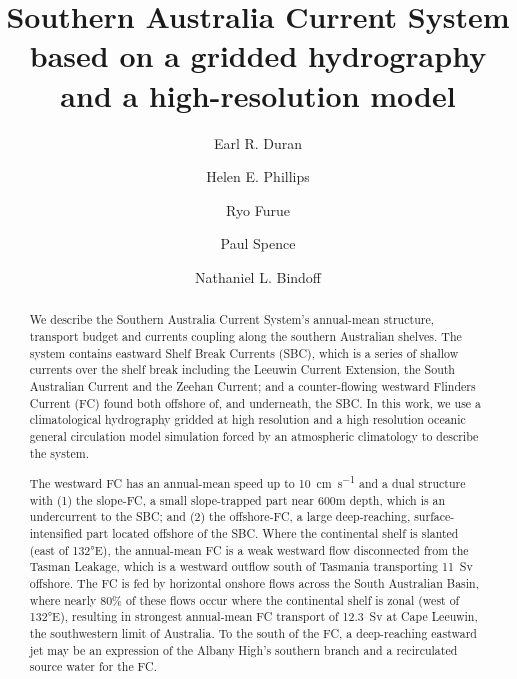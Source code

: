 \documentclass[preprint,3p,review,12pt]{elsarticle}
\begin{document}
\begin{frontmatter}

\title{Southern Australia Current System based on a gridded hydrography and a high-resolution model}

\author[label2]{Earl R. Duran}
\author[label3,label4]{Helen E. Phillips}
\author[label5]{Ryo Furue}
\author[label2,label4]{Paul Spence}
\author[label3,label4,label6,label7]{Nathaniel L. Bindoff}

\address[label2]{Climate Change Research Centre (CCRC), University of New South Wales, Sydney, NSW 2052 Australia}
\address[label3]{Institute for Marine and Antarctic Studies (IMAS), Hobart, Tasmania, Australia}
\address[label4]{ARC Centre of Excellence for Climate Extremes (CLEX)}\address[label5]{Japan Agency for Marine-Earth Science and Technology (JAMSTEC), Yokohama, Japan}
\address[label6]{Commonwealth Scientific and Industrial Research Organisation (CSIRO)}
\address[label7]{Antarctic Climate and Ecosystems Cooperative Research Centre (ACE CRC), Hobart, Tasmania, Australia}


\begin{abstract}
We describe the Southern Australia Current System's annual-mean structure, transport budget and currents coupling along the southern Australian shelves. The system contains eastward Shelf Break Currents (SBC), which is a series of shallow currents over the shelf break including the Leeuwin Current Extension, the South Australian Current and the Zeehan Current; and a counter-flowing westward Flinders Current (FC) found both offshore of, and underneath, the SBC\@.
In this work, we use a climatological hydrography gridded at high resolution and a high resolution oceanic general circulation model simulation forced by an atmospheric climatology to describe the system.

The westward FC has an annual-mean speed up to \SI{10}{\centi\meter\per\second} and a dual structure with (1) the slope-FC, a small slope-trapped part near 600m depth, which is an undercurrent to the SBC; and (2) the offshore-FC, a large deep-reaching, surface-intensified part located offshore of the SBC\@.
Where the continental shelf is slanted (east of \ang{132}E), the annual-mean FC is a weak westward flow disconnected from the Tasman Leakage, which is a westward outflow south of Tasmania transporting \SI{11}{Sv} offshore.
The FC is fed by horizontal onshore flows across the South Australian Basin, where nearly 80\% of these flows occur where the continental shelf is zonal (west of \ang{132}E), resulting in strongest annual-mean FC transport of \SI{12.3}{Sv} at Cape Leeuwin, the southwestern limit of Australia.
To the south of the FC, a deep-reaching eastward jet may be an expression of the Albany High's southern branch and a recirculated source water for the FC.


\end{abstract}
\end{frontmatter}
\end{document}
